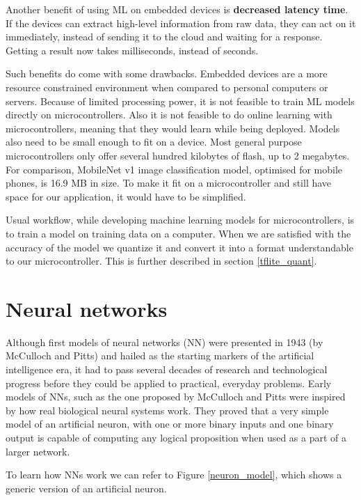 Another benefit of using ML on embedded devices is \textbf{decreased latency time}.
If the devices can extract high-level information from raw data, they can act on it immediately, instead of sending it to the cloud and waiting for a response. 
Getting a result now takes milliseconds, instead of seconds.

Such benefits do come with some drawbacks.
Embedded devices are a more resource constrained environment when compared to personal computers or servers.
Because of limited processing power, it is not feasible to train ML models directly on microcontrollers.
Also it is not feasible to do online learning with microcontrollers, meaning that they would learn while being deployed.
Models also need to be small enough to fit on a device. 
Most general purpose microcontrollers only offer several hundred kilobytes of flash, up to 2 megabytes.
For comparison, MobileNet v1 image classification model, optimised for mobile phones, is 16.9 MB in size\cite{daniel_edgeimpulse}.
To make it fit on a microcontroller and still have space for our application, it would have to be simplified.

Usual workflow, while developing machine learning models for microcontrollers, is to train a model on training data on a computer. 
When we are satisfied with the accuracy of the model we quantize it and convert it into a format understandable to our microcontroller.
This is further described in section \ref{tflite_quant}.

\section{ Neural networks}\label{neural_networks_section}

Although first models of neural networks (NN) were presented in 1943 (by McCulloch and Pitts)\cite{geron} and hailed as the starting markers of the artificial intelligence era, it had to pass several decades of research and technological progress before they could be applied to practical, everyday problems.
Early models of NNs, such as the one proposed by McCulloch and Pitts were inspired by how real biological neural systems work. 
They proved that a very simple model of an artificial neuron, with one or more binary inputs and one binary output is capable of computing any logical proposition when used as a part of a larger network\cite{geron}.

To learn how NNs work we can refer to Figure \ref{neuron_model}, which shows a generic version of an artificial neuron.
\newline


